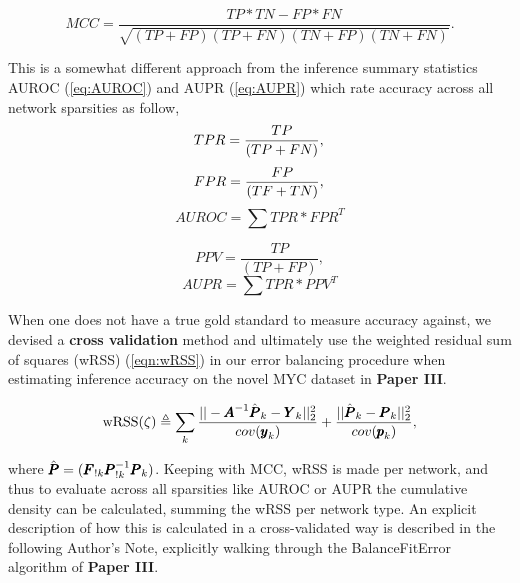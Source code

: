 \begin{equation}\label{eq:MCC}
MCC=\frac{TP*TN-FP*FN}{\sqrt{(TP+FP)(TP+FN)(TN+FP)(TN+FN)}}.
\end{equation}

This is a somewhat different approach from the inference summary statistics AUROC (\cref{eq:AUROC}) and AUPR (\cref{eq:AUPR}) which rate accuracy across all network sparsities as follow,
\begin{equation}\label{eq:TPR}
TPR=\frac{TP}{(TP+FN)},\\ \end{equation}
\begin{equation}\label{eq:FPR}
FPR=\frac{FP}{(TF+TN)},\\ \end{equation}
\begin{equation}\label{eq:AUROC}
AUROC=\sum{TPR*FPR^T}
\end{equation}

\begin{equation}\label{eq:PPV} 
PPV=\frac{TP}{(TP+FP)},\end{equation}
\begin{equation}\label{eq:AUPR}
AUPR=\sum{TPR*PPV^T}
\end{equation}


When one does not have a true gold standard to measure accuracy against, we devised a \textbf{cross validation} method and ultimately use the weighted residual sum of squares (wRSS) (\cref{eqn:wRSS}) in our error balancing procedure when estimating inference accuracy on the novel MYC dataset in \textbf{Paper III}.

\begin{equation}\label{eqn:wRSS}
  \textrm{wRSS}(\zeta) \triangleq \sum_k \frac{||-{\pmb{A}}^{-1}\hat{{\pmb{P}}}_k-{\pmb{Y}}_k||^2_2}{cov({\pmb{y}}_k)}+\frac{||\hat{{\pmb{P}}}_k-{\pmb{P}}_k||^2_2}{cov({\pmb{p}}_k)},
\end{equation}

where $\hat{{\pmb{P}}}=({\pmb{F}}_{!k}{\pmb{P}}^{-1}_{!k}{\pmb{P}}_k)$. Keeping with MCC, wRSS is made per network, and thus to evaluate across all sparsities like AUROC or AUPR the cumulative density can be calculated, summing the wRSS per network type. An explicit description of how this is calculated in a cross-validated way is described in the following Author's Note, explicitly walking through the BalanceFitError algorithm of \textbf{Paper III}.\\

